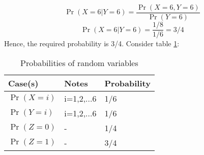 \documentclass[journal,12pt,twocolumn]{IEEEtran}
\begin{document}
$$\Pr(X=6|Y=6) = \frac{\Pr(X=6, Y=6)}{\Pr(Y=6)} $$
$$\Pr(X=6|Y=6) = \frac{1/8}{1/6} = 3/4$$
Hence, the required probability is 3/4.
\newline \newline Consider table \ref{table1}:
\begin{center}
\begin{table}[h]
    \centering
    \begin{tabular}{ |m{1.75cm}| m{1.75cm}| m{2cm} | } 
\hline
Case(s) & Notes & Probability\\ 
\hline
$\Pr(X=i)$ & i=1,2,...6 & 1/6 \\ 
\hline
$\Pr(Y=i)$ & i=1,2,...6 & 1/6 \\ 
\hline
$\Pr(Z=0)$ & - & 1/4 \\ 
\hline 
$\Pr(Z=1)$ & - & 3/4 \\ 
\hline
\end{tabular}
    \caption{Probabilities of random variables}
    \label{table1}
\end{table}
\end{center}
\end{document}
